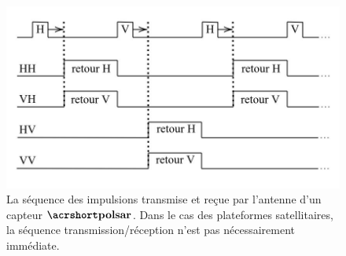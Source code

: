 \begin{figure}[!htbp] 
  \includegraphics[width=0.80 \linewidth]{figures/polsar-acquisition-diagram.jpg}
   \centering
\caption
{\small La séquence des impulsions transmise et reçue par l'antenne d'un capteur $\acrpolsarns$.  Dans le cas des plateformes satellitaires, la séquence transmission/réception n'est pas nécessairement immédiate.}
  \label{fig:polsar-acquisition-diagram}
\end{figure}


